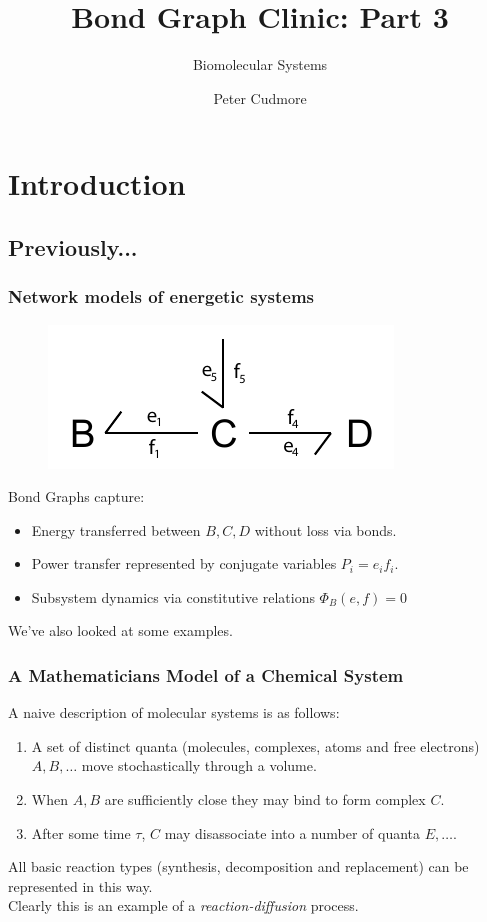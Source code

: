 \documentclass[10pt,reqno]{beamer}
\title{Bond Graph Clinic: Part 3}
\subtitle{Biomolecular Systems}
\author{Peter Cudmore}
\institute{Systems Biology Lab, The University of Melbourne}
\begin{document}
	\begin{frame}
	\titlepage
	\addtocounter{framenumber}{-1} 
\end{frame}
\begin{frame}
\tableofcontents[hideallsubsections]
\end{frame}
\section{Introduction}
\subsection{Previously...}
\begin{frame}
\frametitle{Network models of energetic systems}
\begin{figure}
	\includegraphics{images/bondgraph.pdf}
\end{figure}
Bond Graphs capture:
\begin{itemize}
	\item Energy transferred between $B,C,D$ without loss via bonds.
	\item Power transfer represented by conjugate variables $P_i=e_if_i$.
	\item Subsystem dynamics via constitutive relations $\Phi_B(e,f) = 0$
\end{itemize}
We've also looked at some examples.
\end{frame}
\begin{frame}
\frametitle{A Mathematicians Model of a Chemical System}
A naive description of molecular systems is as follows:
\begin{enumerate}
	\item A set of distinct quanta (molecules, complexes, atoms and free electrons) $A, B, \ldots$ move stochastically through a volume.
	\item When $A, B$ are sufficiently close they may bind to form complex $C$.
	\item After some time $\tau$, $C$ may disassociate into a number of quanta $E, \ldots$.
\end{enumerate}
All basic reaction types (synthesis, decomposition and replacement) can be represented in this way.\\
\vspace*{10pt}
Clearly this is an example of a \emph{reaction-diffusion} process.
\end{frame}
\end{document}
